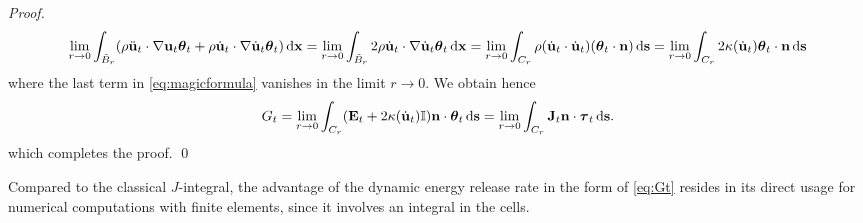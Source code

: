 \begin{proof}
\[
\lim_{r\to 0}\int_{\tilde{B}_r}(\rho\ddot{\vec{u}}_t\cdot\nabla\vec{u}_t\vtheta_t+\rho\dot{\vec{u}}_t\cdot\nabla\dot{\vec{u}}_t\vtheta_t)\dx=\lim_{r\to 0}\int_{\tilde{B}_r}2\rho\dot{\vec{u}}_t\cdot\nabla\dot{\vec{u}}_t\vtheta_t\dx=\lim_{r\to 0}\int_{C_r}\rho(\dot{\vec{u}}_t\cdot\dot{\vec{u}}_t)(\vtheta_t\cdot\vec{n})\ds=\lim_{r\to 0}\int_{C_r}2\kappa(\dot{\vec{u}}_t)\vtheta_t\cdot\vec{n}\ds
\]
where the last term in \eqref{eq:magicformula} vanishes in the limit $r\to 0$. We obtain hence
\begin{equation}
G_t=\lim_{r\to 0}\int_{C_r}(\vec{E}_t+2\kappa(\dot{\vec{u}}_t)\mathbb{I})\vec{n}\cdot\vtheta_t\ds=\lim_{r\to 0}\int_{C_r}\vec{J}_t\vec{n}\cdot\vtau_t\ds.
\end{equation}
which completes the proof. \qed
\end{proof}

\begin{remark}
Compared to the classical $J$-integral, the advantage of the dynamic energy release rate in the form of \eqref{eq:Gt} resides in its direct usage for numerical computations with finite elements, since it involves an integral in the cells. 
\end{remark}

